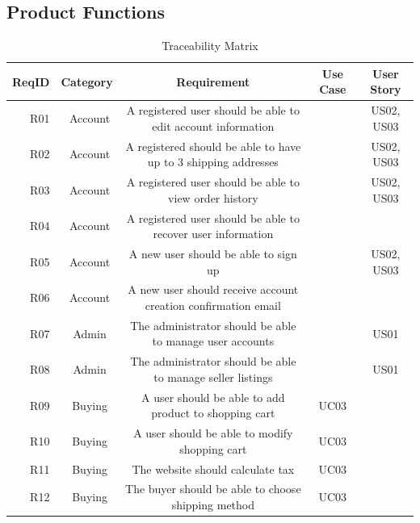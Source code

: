 \documentclass[11pt]{article}
\newcounter{use case ID}
\begin{document}
\subsection{Product Functions}
\begin{table}[H]
        \caption{Traceability Matrix}
        \begin{adjustbox}{width=\columnwidth,center}
            \begin{tabular}{|r | c| c | c| c|}
                \hline
                ReqID & Category & Requirement & Use Case & User Story \\
                \hline
                R01 & \ Account & A \index{registered user}registered user should be able to edit account \index{information}information & & US02, US03 \\
                    \hline
                R02 & \ Account & A registered should be able to have up to 3 shipping addresses &  & US02, US03 \\
                    \hline
                R03 & \ Account & A registered user should be able to view order history &  & US02, US03 \\
                \hline
                R04 & \ Account & A registered user should be able to recover user \index{information}information & &  \\
                \hline
                R05 & \ Account & A new user should be able to sign up & & US02, US03  \\
                \hline
                R06 & \ Account & A new user should receive account creation confirmation email & &  \\
                \hline
                R07 & \ Admin & The \index{administrator}administrator should be able to manage user accounts & & US01  \\
                \hline
                R08 & \ Admin & The \index{administrator}administrator should be able to manage \index{seller}seller listings &  & US01 \\
                \hline
                R09 & \ Buying & A user should be able to add \index{product}product to shopping cart & UC03 &  \\
                \hline
                R10 & \ Buying & A user should be able to modify shopping cart & UC03 &  \\
                \hline
                R11 & \ Buying & The website should calculate tax & UC03 &  \\
                \hline
                R12 & \ Buying & The \index{buyer}buyer should be able to choose shipping method & UC03 &  \\

\end{tabular}
\end{adjustbox}
\end{table}
\end{document}
